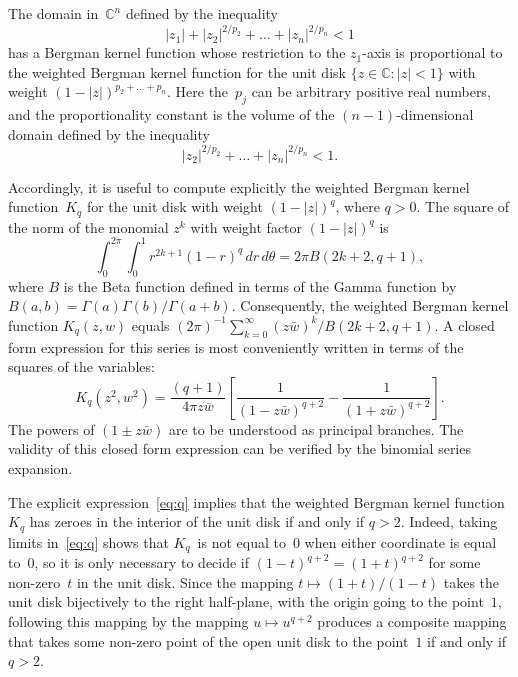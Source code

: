 \documentclass[12pt]{amsart}
\theoremstyle{definition}
\newcommand{\C}{\mathbb{C}}
\newcommand{\Beta}{B}
\begin{document}
The domain in~\(\C^n\) defined by the inequality
\begin{equation}
\label{eq:ex}
|z_1| + |z_2|^{2/p_2} + \dots + |z_n|^{2/p_n} <1
\end{equation}
has a Bergman kernel function whose restriction to the
\(z_1\)-axis is proportional to the weighted Bergman kernel
function for the unit disk \(\{z\in\C: |z|<1\}\) with weight
\((1-|z|)^{p_2+\dots+p_n}\).  Here the~\(p_j\) can be arbitrary
positive real numbers, and the proportionality constant is the
volume of the \((n-1)\)-dimensional domain defined by the
inequality
\begin{equation*}
|z_2|^{2/p_2} + \dots + |z_n|^{2/p_n} <1.
\end{equation*}

Accordingly, it is useful to compute explicitly the weighted
Bergman kernel function~\(K_q\) for the unit disk with weight
\((1-|z|)^q\), where \(q>0\).  The square of the norm of the
monomial \(z^k\) with weight factor \( (1-|z|)^q\) is
\begin{equation*}
\int_0^{2\pi}\int_0^1 r^{2k+1} (1-r)^q \,dr\,d\theta = 
2\pi \Beta(2k+2,q+1),
\end{equation*}
where \(\Beta\) is the Beta function defined in terms of the
Gamma function by \(\Beta(a,b)= \Gamma(a)
\Gamma(b)/\Gamma(a+b)\).  Consequently, the weighted Bergman
kernel function \(K_q(z,w)\) equals
\((2\pi)^{-1}\sum_{k=0}^\infty (z\bar w)^k/\Beta(2k+2,q+1)\). A
closed form expression for this series is most conveniently
written in terms of the squares of the variables:
\begin{equation}
\label{eq:q}
K_q(z^2, w^2)= \frac{(q+1)}{4\pi z\bar w} \left[ \frac{1}{(1-z\bar
w)^{q+2}} - \frac{1}{(1+z\bar w)^{q+2}} \right].
\end{equation}
The powers of $(1\pm z\bar w)$ are to be understood as principal
branches.  The validity of this closed form expression can be
verified by the binomial series expansion.

The explicit expression~\eqref{eq:q} implies that the weighted
Bergman kernel function~\(K_q\) has zeroes in the interior of the
unit disk if and only if \(q>2\). Indeed, taking limits
in~\eqref{eq:q} shows that \(K_q\)~is not equal to~\(0\) when
either coordinate is equal to~\(0\), so it is only necessary to
decide if \((1-t)^{q+2}=(1+t)^{q+2}\) for some non-zero~\(t\) in
the unit disk. Since the mapping \(t\mapsto (1+t)/(1-t)\) takes
the unit disk bijectively to the right half-plane, with the
origin going to the point~\(1\), following this mapping by the
mapping \(u\mapsto u^{q+2}\) produces a composite mapping that
takes some non-zero point of the open unit disk to the
point~\(1\) if and only if \(q>2\).
\end{document}
